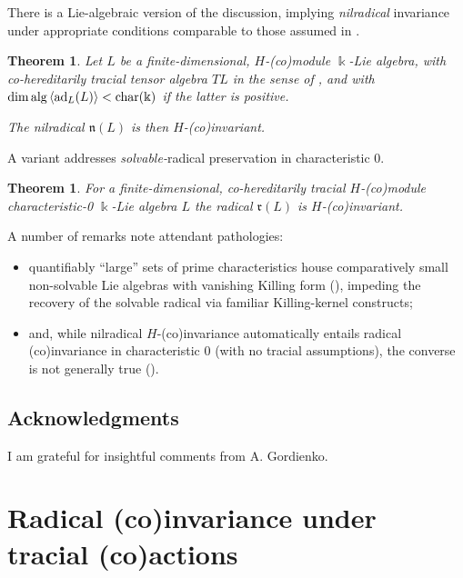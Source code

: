 \documentclass[11pt,leqno]{article}
\theoremstyle{plain}
\newtheorem{theorem}[lemma]{Theorem}
\theoremstyle{plain}
\theoremstyle{plain}
\numberwithin{equation}{section}
\theoremstyle{nonumberplain}
\newcommand\fn{{\mathfrak n}}
\newcommand\fr{{\mathfrak r}}
\newcommand\1{{\bf 1}}
\begin{document}
There is a Lie-algebraic version of the discussion, implying \emph{nilradical} \cite[\S I.7, post Proposition 6]{jac_lie_1979} invariance under appropriate conditions comparable to those assumed in . 

\begin{theorem}\label{th:leaves.lie.nil.rad.inv}
  Let $L$ be a finite-dimensional, $H$-(co)module $\Bbbk$-Lie algebra, with co-hereditarily tracial tensor algebra $TL$ in the sense of , and with $\dim \mathrm{alg}\Braket{\mathrm{ad}_L(L)}<\mathrm{char}(\Bbbk)$ if the latter is positive.

  The nilradical $\fn(L)$ is then $H$-(co)invariant.
\end{theorem}

A variant addresses \emph{solvable-}radical preservation in characteristic 0.

\begin{theorem}\label{th:char0.solv.rad.trcl}
  For a finite-dimensional, co-hereditarily tracial $H$-(co)module characteristic-0 $\Bbbk$-Lie algebra $L$ the radical $\fr(L)$ is $H$-(co)invariant.   
\end{theorem}

A number of remarks note attendant pathologies:
\begin{itemize}[wide]
\item quantifiably ``large'' sets of prime characteristics house comparatively small non-solvable Lie algebras with vanishing Killing form (), impeding the recovery of the solvable radical via familiar Killing-kernel constructs;

\item and, while nilradical $H$-(co)invariance automatically entails radical (co)invariance in characteristic 0 (with no tracial assumptions), the converse is not generally true (). 
\end{itemize}



\subsection*{Acknowledgments}

I am grateful for insightful comments from A. Gordienko. 



\section{Radical (co)invariance under tracial (co)actions}\label{se:rad.coinv}
\end{document}
